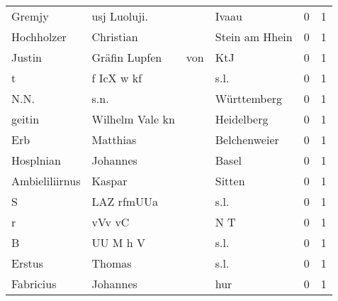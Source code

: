 \documentclass[10pt,a4paper,landscape]{article}
\begin{document}
\begin{longtable}{llllrr}
                   Gremjy &                       usj Luoluji. &             &                                       Ivaau &          0 &         1 \\
               Hochholzer &                          Christian &             &                              Stein am Hhein &          0 &         1 \\
                   Justin &                     Gräfin  Lupfen &         von &                                         KtJ &          0 &         1 \\
                        t &                         f IcX w kf &             &                                        s.l. &          0 &         1 \\
                     N.N. &                               s.n. &             &                                 Württemberg &          0 &         1 \\
                   geitin &                    Wilhelm Vale kn &             &                                  Heidelberg &          0 &         1 \\
                      Erb &                           Matthias &             &                                Belchenweier &          0 &         1 \\
                Hosplnian &                           Johannes &             &                                       Basel &          0 &         1 \\
           Ambieliliirnus &                             Kaspar &             &                                      Sitten &          0 &         1 \\
                        S &                         LAZ rfmUUa &             &                                        s.l. &          0 &         1 \\
                        r &                             vVv vC &             &                                         N T &          0 &         1 \\
                        B &                           UU M h V &             &                                        s.l. &          0 &         1 \\
                   Erstus &                             Thomas &             &                                        s.l. &          0 &         1 \\
                Fabricius &                           Johannes &             &                                         hur &          0 &         1 \\

\end{longtable}
\end{document}
